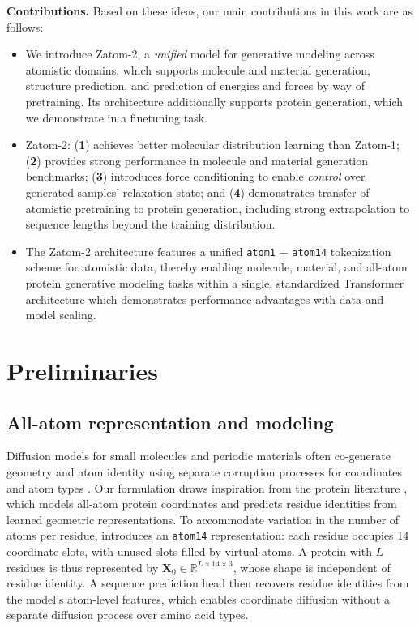 \documentclass{article} %
\begin{document}
\textbf{Contributions.} Based on these ideas, our main contributions in this work are as follows:
\begin{itemize}
    \item We introduce Zatom-2, a \emph{unified} model for generative modeling across atomistic domains, which supports molecule and material generation, structure prediction, and prediction of energies and forces by way of pretraining. Its architecture additionally supports protein generation, which we demonstrate in a finetuning task.
    \item Zatom-2: (\textbf{1}) achieves better molecular distribution learning than Zatom-1; (\textbf{2}) provides strong performance in molecule and material generation benchmarks; (\textbf{3}) introduces force conditioning to enable \emph{control} over generated samples' relaxation state; and (\textbf{4}) demonstrates transfer of atomistic pretraining to protein generation, including strong extrapolation to sequence lengths beyond the training distribution.
    \item The Zatom-2 architecture features a unified \texttt{atom1} + \texttt{atom14} tokenization scheme for atomistic data, thereby enabling molecule, material, and all-atom protein generative modeling tasks within a single, standardized Transformer architecture which demonstrates performance advantages with data and model scaling.
\end{itemize}

\section{Preliminaries}
\label{sec:preliminaries}

\subsection{All-atom representation and modeling}
\label{sec:all-atom-representation-and-modeling}
Diffusion models for small molecules and periodic materials often co-generate geometry and atom identity using separate corruption processes for coordinates and atom types \citep{vignac2023midi,zeni2025generative,joshi2025allatom,tabasco}. Our formulation draws inspiration from the protein literature \citep{qu2025pallatom, butcher2025rfdiffusion3}, which models all-atom protein coordinates and predicts residue identities from learned geometric representations. To accommodate variation in the number of atoms per residue, \citet{qu2025pallatom} introduces an \texttt{atom14} representation: each residue occupies 14 coordinate slots, with unused slots filled by virtual atoms. A protein with $L$ residues is thus represented by $\mathbf{X}_0 \in \mathbb{R}^{L \times 14 \times 3}$, whose shape is independent of residue identity. A sequence prediction head then recovers residue identities from the model's atom-level features, which enables coordinate diffusion without a separate diffusion process over amino acid types. 
\end{document}
